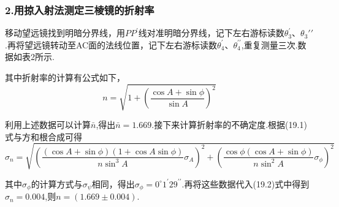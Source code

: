 \documentclass[12pt,a4paper,UTF8]{ctexart}
\begin{document}
\subsubsection*{2.用掠入射法测定三棱镜的折射率}
移动望远镜找到明暗分界线，用$PP^{\prime}$线对准明暗分界线，记下左右游标读数$\theta_3^{\prime}$、$\theta_3{\prime \prime}$.再将望远镜转动至AC面的法线位置，记下左右游标读数$\theta_4^{\prime}$、$\theta_4^{\prime \prime}$,重复测量三次.数据如表2所示.\par
其中折射率的计算有公式如下，
\begin{equation}
n=\sqrt{1+(\frac{\cos A+\sin \phi}{\sin A})^2} \tag{19.1}
\end{equation}
\begin{table}[htbp]
\centering
\caption{掠入法测定玻璃三棱镜折射率数据表}
\end{table}
\par
利用上述数据可以计算$\bar n$,得出$\bar n=1.669$.接下来计算折射率的不确定度.根据(19.1)式与方和根合成可得
\begin{equation}
\sigma_n=\sqrt{\left(\frac{(\cos A+\sin \phi)(1+\cos A\sin \phi)}{n\sin^3A}\sigma_A\right)^2+\left(\frac{\cos\phi(\cos A+\sin \phi)}{n\sin^2A}\sigma_{\phi}\right)^2} \tag{19.2}
\end{equation}
\par	
其中$\sigma_{\phi}$的计算方式与$\sigma_{\psi}$相同，得出$\sigma_{\phi}=0^{\circ}1^{\prime}29^{\prime \prime}$.再将这些数据代入(19.2)式中得到$\sigma_n=0.004$,则$n=(1.669\pm0.004)$.
\end{document}
